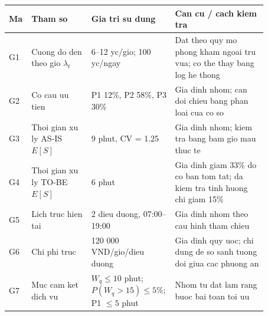 \begin{tabular}{p{0.05\linewidth}p{0.22\linewidth}p{0.26\linewidth}p{0.34\linewidth}}
\toprule
\textbf{Ma} & \textbf{Tham so} & \textbf{Gia tri su dung} & \textbf{Can cu / cach kiem tra} \\
\midrule
G1 & Cuong do den theo gio $\lambda_t$ & 6--12 yc/gio; 100 yc/ngay & Dat theo quy mo phong kham ngoai tru vua; co the thay bang log he thong \\
G2 & Co cau uu tien & P1 12\%, P2 58\%, P3 30\% & Gia dinh nhom; can doi chieu bang phan loai cua co so \\
G3 & Thoi gian xu ly AS-IS $E[S]$ & 9 phut, CV = 1.25 & Gia dinh nhom; kiem tra bang bam gio mau thuc te \\
G4 & Thoi gian xu ly TO-BE $E[S]$ & 6 phut & Gia dinh giam 33\% do co ban tom tat; da kiem tra tinh huong chi giam 15\% \\
G5 & Lich truc hien tai & 2 dieu duong, 07:00--19:00 & Gia dinh nhom theo cau hinh tham chieu \\
G6 & Chi phi truc & 120 000 VND/gio/dieu duong & Gia dinh quy uoc; chi dung de so sanh tuong doi giua cac phuong an \\
G7 & Muc cam ket dich vu & $W_q \leq 10$ phut; $P(W_q>15) \leq 5\%$; P1 $\leq 5$ phut & Nhom tu dat lam rang buoc bai toan toi uu \\
\bottomrule
\end{tabular}
